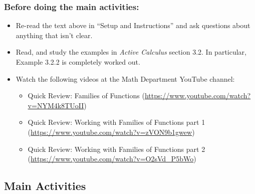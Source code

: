\documentclass[11pt,letterpaper]{article}
\begin{document}
\subsubsection*{Before doing the main activities:}
\begin{itemize}
    \item Re-read the text above in ``Setup and Instructions'' and ask questions about anything that isn't clear. 
    \item Read, and study the examples in \emph{Active Calculus} section 3.2. In particular, Example 3.2.2 is completely worked out. 
    \item Watch the following videos at the Math Department YouTube channel: 
    \begin{itemize}
        \item Quick Review: Families of Functions (\url{https://www.youtube.com/watch?v=NYM4k8TUoII})
        \item Quick Review: Working with Families of Functions part 1 (\url{https://www.youtube.com/watch?v=zVON9b1gwew}) 
        \item Quick Review: Working with Families of Functions part 2 (\url{https://www.youtube.com/watch?v=O2sVd_P5bWo}) 
    \end{itemize}
\end{itemize}


\subsection*{Main Activities}
\end{document}
